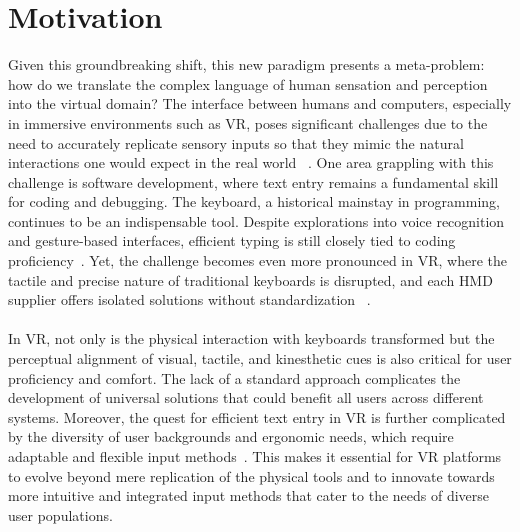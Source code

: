 \section{Motivation}
\label{sec:Motivation}
Given this groundbreaking shift, this new paradigm presents a meta-problem: how do we
translate the complex language of human sensation and perception~\cite{goldstein2016sensation} into the virtual domain? The interface between humans and computers, especially in immersive environments
such as \ac{VR}, poses significant challenges due to the need to accurately
replicate sensory inputs so that they mimic the natural interactions one would expect in the
real world ~\cite{sheridan1992musings,slater2018implicit}. One area grappling with this challenge is software development, where
text entry remains a fundamental skill for coding and debugging. The keyboard, a historical
mainstay in programming, continues to be an indispensable tool. Despite explorations into
voice recognition and gesture-based interfaces, efficient typing is still closely tied to coding
proficiency~\cite{dahl2018text}. Yet, the challenge becomes even more pronounced in \ac{VR}, where the tactile
and precise nature of traditional keyboards is disrupted, and each \ac{HMD} supplier offers isolated solutions without standardization ~\cite{kruger2018text}.\\ \\
In \ac{VR}, not only is the physical interaction with keyboards transformed but the perceptual alignment of visual, tactile, and kinesthetic cues is also critical for user proficiency and
comfort. The lack of a standard approach complicates the development of universal solutions
that could benefit all users across different systems. Moreover, the quest for efficient
text entry in \ac{VR} is further complicated by the diversity of user backgrounds and ergonomic
needs, which require adaptable and flexible input methods~\cite{bowman2007virtual}. This makes it essential for \ac{VR} platforms to evolve beyond mere replication of the physical tools and to innovate towards more intuitive and integrated input methods that cater to the needs of diverse user
populations.

